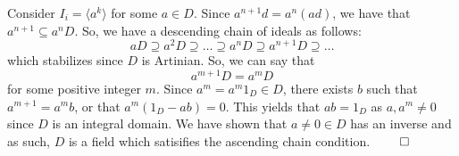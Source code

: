 \documentclass{report}
\begin{document}
\sol Consider $I_i = \langle a^k \rangle$ for some $a \in D$. Since $a^{n+1}d = a^n(ad)$, we have that $a^{n+1} \subseteq a^nD$. So, we have a descending chain of ideals as follows:
$$aD \supseteq a^2D \supseteq \ldots \supseteq a^nD \supseteq a^{n + 1}D \supseteq \ldots$$
which stabilizes since $D$ is Artinian. So, we can say that 
$$a^{m + 1}D = a^mD$$
for some positive integer $m$. Since $a^m = a^m 1_D \in D$, there exists $b$ such that $a^{m+1} = a^mb$, or that $a^m(1_D - ab) = 0$. This yields that $ab = 1_D$ as $a, a^m \neq 0$ since $D$ is an integral domain. We have shown that $a \neq 0 \in D$ has an inverse and as such, $D$ is a field which satisifies the ascending chain condition. $\qed$
\end{document}
